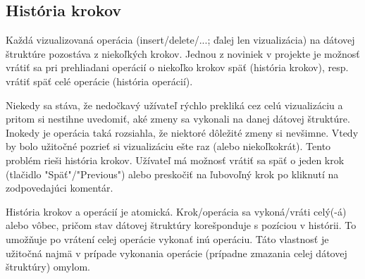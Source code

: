 \subsection{História krokov}
Každá vizualizovaná operácia (insert/delete/...; ďalej len vizualizácia) na 
dátovej štruktúre pozostáva
z niekoľkých krokov. Jednou z noviniek v projekte je možnosť vrátiť sa pri
prehliadani operácií o niekoľko krokov späť (história krokov), resp. vrátiť späť
celé operácie (história operácií).

Niekedy sa stáva, že nedočkavý užívateľ rýchlo prekliká cez celú vizualizáciu a pritom si nestihne uvedomiť, aké zmeny sa vykonali na danej dátovej
štruktúre. Inokedy je operácia taká rozsiahla, že niektoré dôležité zmeny si
nevšimne. Vtedy by bolo užitočné pozrieť si vizualizáciu ešte raz (alebo
niekoľkokrát). Tento problém rieši história krokov. Užívateľ má možnosť vrátiť
sa späť o jeden krok (tlačidlo "Späť"/"Previous") alebo preskočiť na ľubovoľný
krok po kliknutí na zodpovedajúci komentár.

História krokov a operácií je atomická. Krok/operácia sa vykoná/vráti celý(-á)
alebo vôbec, pričom stav dátovej štruktúry korešponduje s pozíciou v histórii.
To umožňuje po vrátení celej operácie vykonať inú operáciu. Táto vlastnosť je
užitočná najmä v prípade vykonania operácie (prípadne zmazania celej dátovej
štruktúry) omylom.

